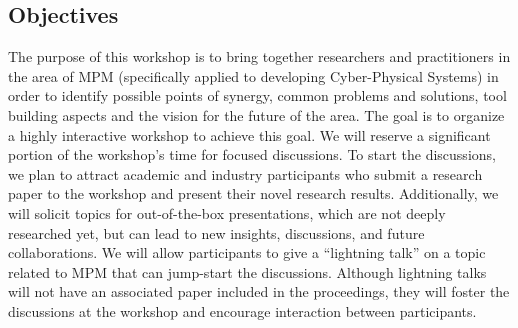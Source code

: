
\subsection{Objectives}
The purpose of this workshop is to bring together researchers and practitioners 
in the area of MPM (specifically applied to developing Cyber-Physical Systems) in 
order to identify possible points of synergy, common problems and solutions, 
tool building aspects and the vision for the future of the area.
The goal is to organize a highly interactive workshop to achieve this goal.
We will reserve a significant portion of the workshop's time for focused discussions.
To start the discussions, we plan to attract academic and industry participants 
who submit a research paper to the workshop and present their novel research results.
Additionally, we will solicit topics for out-of-the-box presentations, which are 
not deeply researched yet, but can lead to new insights, discussions, and future 
collaborations.
We will allow participants to give a ``lightning talk'' on a topic related to 
MPM that can jump-start the discussions.
Although lightning talks will not have an associated paper included in the 
proceedings, they will foster the discussions at the workshop and encourage 
interaction between participants.

